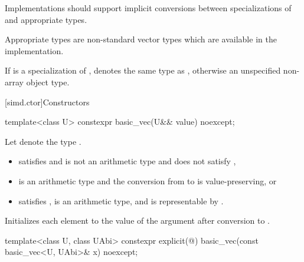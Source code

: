 \pnum
\recommended
Implementations should support implicit conversions between specializations of
 and appropriate  types.
\begin{note}
Appropriate types are non-standard vector types which are available in the
implementation.
\end{note}

\pnum
If  is a specialization of ,
 denotes the same type as
,
otherwise an unspecified non-array object type.

[simd.ctor]{Constructors}

\begin{itemdecl}
template<class U> constexpr basic_vec(U&& value) noexcept;
\end{itemdecl}

\begin{itemdescr}
\pnum
Let  denote the type .

\pnum
\constraints
\begin{itemize}
\item
{} satisfies  and
 is not an arithmetic type and
does not satisfy ,
\item
{} is an arithmetic type and
the conversion from  to 
is value-preserving, or
\item
{} satisfies ,
 is an arithmetic type, and
 is representable by .
\end{itemize}

\pnum
\effects
Initializes each element to the value of the argument after conversion to
.
\end{itemdescr}

\begin{itemdecl}
template<class U, class UAbi>
  constexpr explicit(@\seebelow@) basic_vec(const basic_vec<U, UAbi>& x) noexcept;
\end{itemdecl}

